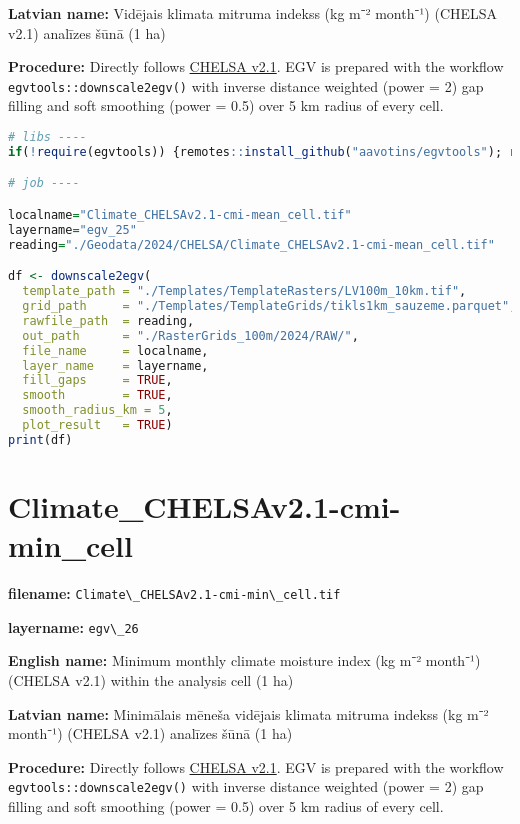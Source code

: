 \documentclass[
]{book}
\newcommand{\passthrough}[1]{#1}
\begin{document}
\textbf{Latvian name:} Vidējais klimata mitruma indekss (kg m⁻² month⁻¹) (CHELSA v2.1) analīzes šūnā (1 ha)

\textbf{Procedure:} Directly follows \hyperref[Ch04.11]{CHELSA v2.1}. EGV is prepared with the
workflow \passthrough{\lstinline!egvtools::downscale2egv()!} with inverse distance weighted (power = 2)
gap filling and soft smoothing (power = 0.5) over 5 km radius of every cell.

\begin{lstlisting}[language=R]
# libs ----
if(!require(egvtools)) {remotes::install_github("aavotins/egvtools"); require(egvtools)}

# job ----

localname="Climate_CHELSAv2.1-cmi-mean_cell.tif"
layername="egv_25"
reading="./Geodata/2024/CHELSA/Climate_CHELSAv2.1-cmi-mean_cell.tif"

df <- downscale2egv(
  template_path = "./Templates/TemplateRasters/LV100m_10km.tif",
  grid_path     = "./Templates/TemplateGrids/tikls1km_sauzeme.parquet",
  rawfile_path  = reading,
  out_path      = "./RasterGrids_100m/2024/RAW/",
  file_name     = localname,
  layer_name    = layername,
  fill_gaps     = TRUE,
  smooth        = TRUE,
  smooth_radius_km = 5,
  plot_result   = TRUE)
print(df)
\end{lstlisting}

\section{Climate\_CHELSAv2.1-cmi-min\_cell}\label{ch06.026}

\textbf{filename:} \passthrough{\lstinline!Climate\_CHELSAv2.1-cmi-min\_cell.tif!}

\textbf{layername:} \passthrough{\lstinline!egv\_26!}

\textbf{English name:} Minimum monthly climate moisture index (kg m⁻² month⁻¹) (CHELSA v2.1) within the analysis cell (1 ha)

\textbf{Latvian name:} Minimālais mēneša vidējais klimata mitruma indekss (kg m⁻² month⁻¹) (CHELSA v2.1) analīzes šūnā (1 ha)

\textbf{Procedure:} Directly follows \hyperref[Ch04.11]{CHELSA v2.1}. EGV is prepared with the
workflow \passthrough{\lstinline!egvtools::downscale2egv()!} with inverse distance weighted (power = 2)
gap filling and soft smoothing (power = 0.5) over 5 km radius of every cell.
\end{document}
